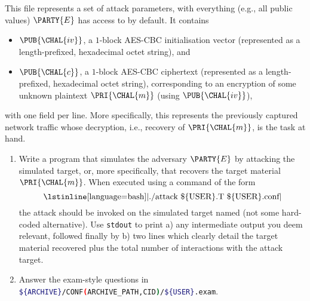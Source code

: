 
This file represents a set of attack parameters, with everything (e.g.,
all public values) $\PARTY{E}$ has access to by default.  It contains 

\begin{itemize}
\item $\PUB{\CHAL{iv}}$,
      a  ${1}$-block AES-CBC initialisation vector
      (represented as a  length-prefixed, hexadecimal octet   string),
      and
\item $\PUB{\CHAL{c}}$,
      a  ${1}$-block AES-CBC ciphertext 
      (represented as a  length-prefixed, hexadecimal octet   string),
      corresponding to an encryption of some unknown plaintext 
      $\PRI{\CHAL{m}}$ (using $\PUB{\CHAL{iv}}$),
\end{itemize}

\noindent
with one field per line.
More specifically, this represents the previously captured network traffic
whose decryption, i.e., recovery of $\PRI{\CHAL{m}}$, is the task at hand.
%



\begin{enumerate}
\item Write a program that simulates the adversary $\PARTY{E}$ by attacking
      the simulated target, or, more specifically, that recovers the target 
      material $\PRI{\CHAL{m}}$.  
      When executed using a command of the form
      \[
      \mbox{\lstinline[language={bash}]|./attack \$\{USER\}.T \$\{USER\}.conf|}
      \]
      the attack should be invoked on the simulated target named (not some
      hard-coded alternative).  Use \lstinline[language={bash}]{stdout} to 
      print 
      a) any intermediate output you deem relevant, followed finally by 
      b) two lines which clearly detail the target material recovered plus
         the total number of interactions with the attack target.
\item Answer the exam-style questions in 
      \lstinline[language={bash}]|${ARCHIVE}/CONF(ARCHIVE_PATH,CID)/${USER}.exam|.
\end{enumerate}

